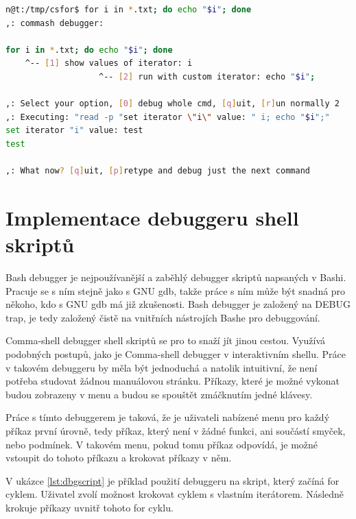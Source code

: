 \documentclass[thesis=M,czech]{FITthesis}[2012/06/26]
\begin{document}
\begin{minipage}{\linewidth}
\begin{lstlisting}[language=bash, caption={Debugger interaktivního shellu - změna iterátoru for cyklu}, label={lst:dbginteractiveforcycle2}]
n@t:/tmp/csfor$ for i in *.txt; do echo "$i"; done
,: commash debugger:

for i in *.txt; do echo "$i"; done
    ^-- [1] show values of iterator: i
                   ^-- [2] run with custom iterator: echo "$i";

,: Select your option, [0] debug whole cmd, [q]uit, [r]un normally 2
,: Executing: "read -p "set iterator \"i\" value: " i; echo "$i";"
set iterator "i" value: test
test

,: What now? [q]uit, [p]retype and debug just the next command
\end{lstlisting}
\end{minipage}





\section{Implementace debuggeru shell skriptů}

Bash debugger je nejpoužívanější a zaběhlý debugger skriptů napsaných v Bashi. Pracuje se s ním stejně jako s GNU gdb, takže práce s ním může být snadná pro někoho, kdo s GNU gdb má již zkušenosti. Bash debugger je založený na DEBUG trap, je tedy založený čistě na vnitřních nástrojích Bashe pro debuggování.



Comma-shell debugger shell skriptů se pro to snaží jít jinou cestou. Využívá podobných postupů, jako je Comma-shell debugger v interaktivním shellu. Práce v takovém debuggeru by měla být jednoduchá a natolik intuitivní, že není potřeba studovat žádnou manuálovou stránku. Příkazy, které je možné vykonat budou zobrazeny v menu a budou se spouštět zmáčknutím jedné klávesy.

Práce s tímto debuggerem je taková, že je uživateli nabízené menu pro každý příkaz první úrovně, tedy příkaz, který není v žádné funkci, ani součástí smyček, nebo podmínek. V takovém menu, pokud tomu příkaz odpovídá, je možné vstoupit do tohoto příkazu a krokovat příkazy v něm.

V ukázce \ref{lst:dbgscript} je příklad použití debuggeru na skript, který začíná for cyklem. Uživatel zvolí možnost krokovat cyklem s vlastním iterátorem. Následně krokuje příkazy uvnitř tohoto for cyklu.
\end{document}
